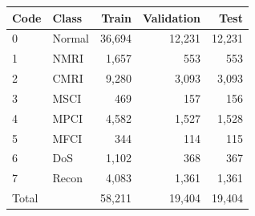\begin{tabular}{llrrr}
\toprule
Code & Class & Train & Validation & Test \\
\midrule
0 & Normal & 36,694 & 12,231 & 12,231 \\
1 & NMRI & 1,657 & 553 & 553 \\
2 & CMRI & 9,280 & 3,093 & 3,093 \\
3 & MSCI & 469 & 157 & 156 \\
4 & MPCI & 4,582 & 1,527 & 1,528 \\
5 & MFCI & 344 & 114 & 115 \\
6 & DoS & 1,102 & 368 & 367 \\
7 & Recon & 4,083 & 1,361 & 1,361 \\
Total & & 58,211 & 19,404 & 19,404 \\
\bottomrule
\end{tabular}
